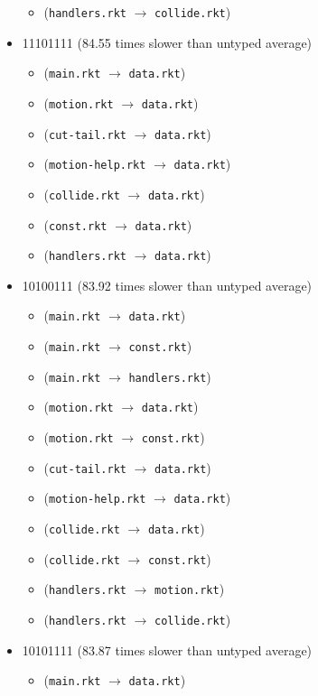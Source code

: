 \documentclass{article}
\newcommand{\mono}[1]{\texttt{#1}}
\begin{document}
\begin{itemize}
\begin{itemize}
  \item (\mono{handlers.rkt} $\rightarrow$ \mono{collide.rkt})
  \end{itemize}
\item 11101111 (84.55 times slower than untyped average)
  \begin{itemize}
  \item (\mono{main.rkt} $\rightarrow$ \mono{data.rkt})
  \item (\mono{motion.rkt} $\rightarrow$ \mono{data.rkt})
  \item (\mono{cut-tail.rkt} $\rightarrow$ \mono{data.rkt})
  \item (\mono{motion-help.rkt} $\rightarrow$ \mono{data.rkt})
  \item (\mono{collide.rkt} $\rightarrow$ \mono{data.rkt})
  \item (\mono{const.rkt} $\rightarrow$ \mono{data.rkt})
  \item (\mono{handlers.rkt} $\rightarrow$ \mono{data.rkt})
  \end{itemize}
\item 10100111 (83.92 times slower than untyped average)
  \begin{itemize}
  \item (\mono{main.rkt} $\rightarrow$ \mono{data.rkt})
  \item (\mono{main.rkt} $\rightarrow$ \mono{const.rkt})
  \item (\mono{main.rkt} $\rightarrow$ \mono{handlers.rkt})
  \item (\mono{motion.rkt} $\rightarrow$ \mono{data.rkt})
  \item (\mono{motion.rkt} $\rightarrow$ \mono{const.rkt})
  \item (\mono{cut-tail.rkt} $\rightarrow$ \mono{data.rkt})
  \item (\mono{motion-help.rkt} $\rightarrow$ \mono{data.rkt})
  \item (\mono{collide.rkt} $\rightarrow$ \mono{data.rkt})
  \item (\mono{collide.rkt} $\rightarrow$ \mono{const.rkt})
  \item (\mono{handlers.rkt} $\rightarrow$ \mono{motion.rkt})
  \item (\mono{handlers.rkt} $\rightarrow$ \mono{collide.rkt})
  \end{itemize}
\item 10101111 (83.87 times slower than untyped average)
  \begin{itemize}
  \item (\mono{main.rkt} $\rightarrow$ \mono{data.rkt})

\end{itemize}
\end{itemize}
\end{document}
